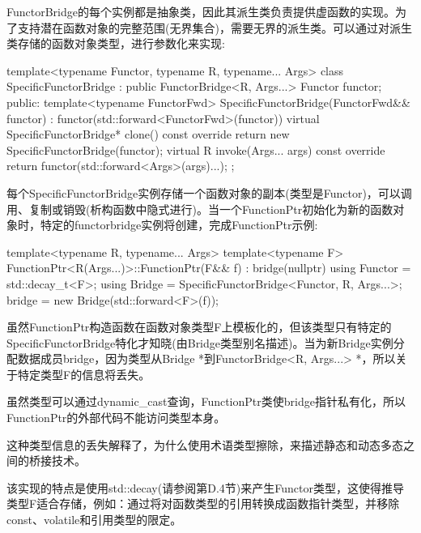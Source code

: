 FunctorBridge的每个实例都是抽象类，因此其派生类负责提供虚函数的实现。为了支持潜在函数对象的完整范围(无界集合)，需要无界的派生类。可以通过对派生类存储的函数对象类型，进行参数化来实现:

\begin{cpp}
template<typename Functor, typename R, typename... Args>
class SpecificFunctorBridge : public FunctorBridge<R, Args...> {
	Functor functor;
	public:
	template<typename FunctorFwd>
	SpecificFunctorBridge(FunctorFwd&& functor)
	: functor(std::forward<FunctorFwd>(functor)) {
	}
	virtual SpecificFunctorBridge* clone() const override {
		return new SpecificFunctorBridge(functor);
	}
	virtual R invoke(Args... args) const override {
		return functor(std::forward<Args>(args)...);
	}
};
\end{cpp}

每个SpecificFunctorBridge实例存储一个函数对象的副本(类型是Functor)，可以调用、复制或销毁(析构函数中隐式进行)。当一个FunctionPtr初始化为新的函数对象时，特定的functorbridge实例将创建，完成FunctionPtr示例:

\begin{cpp}
template<typename R, typename... Args>
template<typename F>
FunctionPtr<R(Args...)>::FunctionPtr(F&& f)
: bridge(nullptr)
{
	using Functor = std::decay_t<F>;
	using Bridge = SpecificFunctorBridge<Functor, R, Args...>;
	bridge = new Bridge(std::forward<F>(f));
}
\end{cpp}

虽然FunctionPtr构造函数在函数对象类型F上模板化的，但该类型只有特定的SpecificFunctorBridge特化才知晓(由Bridge类型别名描述)。当为新Bridge实例分配数据成员bridge，因为类型从Bridge *到FunctorBridge<R, Args...> *，所以关于特定类型F的信息将丢失。

\begin{notice}虽然类型可以通过dynamic\_cast查询，FunctionPtr类使bridge指针私有化，所以FunctionPtr的外部代码不能访问类型本身。
\end{notice}

这种类型信息的丢失解释了，为什么使用术语类型擦除，来描述静态和动态多态之间的桥接技术。

该实现的特点是使用std::decay(请参阅第D.4节)来产生Functor类型，这使得推导类型F适合存储，例如：通过将对函数类型的引用转换成函数指针类型，并移除const、volatile和引用类型的限定。







































